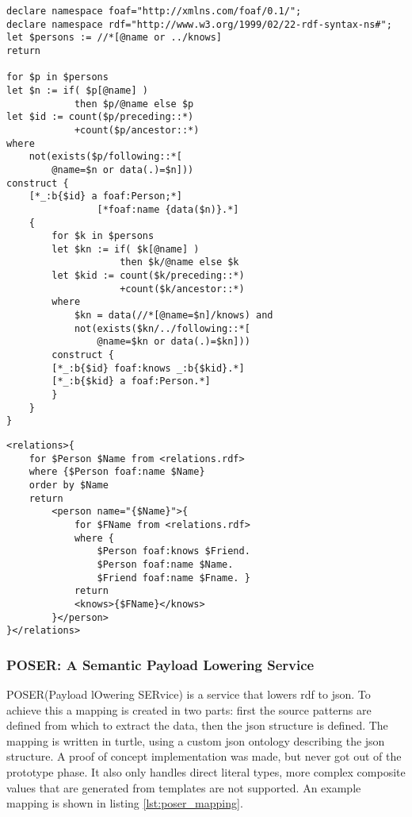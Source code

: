 \begin{lstlisting}[caption={Example of \acrshort{xsparql} lifting}, label={lst:xsparql_lifting}, captionpos=b, basicstyle=\small, float=!ht, frame=single]
declare namespace foaf="http://xmlns.com/foaf/0.1/";
declare namespace rdf="http://www.w3.org/1999/02/22-rdf-syntax-ns#";
let $persons := //*[@name or ../knows]
return

for $p in $persons
let $n := if( $p[@name] )
            then $p/@name else $p
let $id := count($p/preceding::*)
            +count($p/ancestor::*)
where
    not(exists($p/following::*[
        @name=$n or data(.)=$n]))
construct {
    [*_:b{$id} a foaf:Person;*]
                [*foaf:name {data($n)}.*]
    {
        for $k in $persons
        let $kn := if( $k[@name] )
                    then $k/@name else $k
        let $kid := count($k/preceding::*)
                    +count($k/ancestor::*)
        where
            $kn = data(//*[@name=$n]/knows) and
            not(exists($kn/../following::*[
                @name=$kn or data(.)=$kn]))
        construct {
        [*_:b{$id} foaf:knows _:b{$kid}.*]
        [*_:b{$kid} a foaf:Person.*]
        }
    }
}
\end{lstlisting}

\begin{lstlisting}[caption={Example of \acrshort{xsparql} lowering}, label={lst:xsparql_lowering}, captionpos=b, basicstyle=\small, float=!ht, frame=single]
<relations>{
    for $Person $Name from <relations.rdf>
    where {$Person foaf:name $Name}
    order by $Name
    return
        <person name="{$Name}">{
            for $FName from <relations.rdf>
            where {
                $Person foaf:knows $Friend.
                $Person foaf:name $Name.
                $Friend foaf:name $Fname. }
            return
            <knows>{$FName}</knows>
        }</person>
}</relations>
\end{lstlisting}


\subsubsection{POSER: A Semantic Payload Lowering Service \citep{poser}}
POSER(Payload lOwering SERvice) is a service that lowers \acrshort{rdf} to \acrshort{json}. To achieve this a mapping is created in two parts: first the source patterns are defined from which to extract the data, then the json structure is defined. The mapping is written in turtle, using a custom json ontology describing the json structure. A proof of concept implementation was made, but never got out of the prototype phase. It also only handles direct literal types, more complex composite values that are generated from templates are not supported. An example mapping is shown in listing \ref{lst:poser_mapping}.

